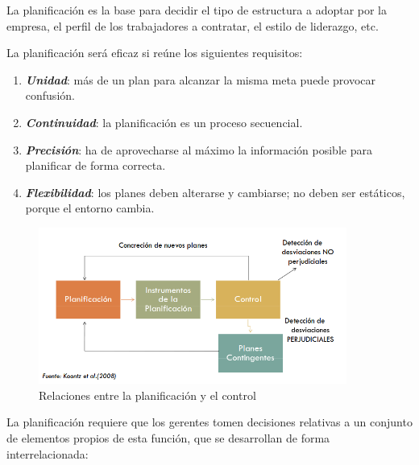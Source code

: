 \documentclass[12pt,a4paper,spanish]{report}
\begin{document}
		La planificación es la base para decidir el tipo de estructura a adoptar por la empresa, el perfil de los trabajadores a contratar, el estilo de liderazgo, etc.

		La planificación será eficaz si reúne los siguientes requisitos:
		\begin{enumerate}[1.]
			\item \textcolor[rgb]{0.3,0.6,0.4}{\textbf{\emph{Unidad}}}: más de un plan para alcanzar la misma meta puede provocar confusión.

			\item \textcolor[rgb]{0.3,0.6,0.4}{\textbf{\emph{Continuidad}}}: la planificación es un proceso secuencial.

			\item \textcolor[rgb]{0.3,0.6,0.4}{\textbf{\emph{Precisión}}}: ha de aprovecharse al máximo la información posible para planificar de forma correcta.

			\item \textcolor[rgb]{0.3,0.6,0.4}{\textbf{\emph{Flexibilidad}}}: los planes deben alterarse y cambiarse; no deben ser estáticos, porque el entorno cambia.
		\end{enumerate}

		\begin{figure}
			 	\centering
			 		\includegraphics[width=0.9\textwidth]{4}
			 	\caption{Relaciones entre la planificación y el control}
			 	\label{plan_control}
		 \end{figure}

		La planificación requiere que los gerentes tomen decisiones relativas a un conjunto de elementos propios de esta función, que se desarrollan de forma interrelacionada:
\end{document}
